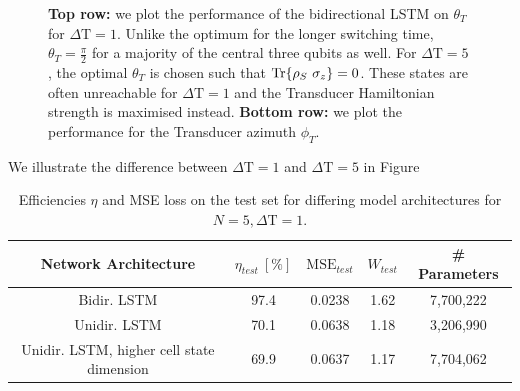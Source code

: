 \begin{figure}
\begin{subfigure}{0.32\textwidth}
	\end{subfigure}
	\caption{\textbf{Top row:} we plot the performance of the bidirectional LSTM on $\theta_T$ for $\Delta \mathrm{T} = 1$. Unlike the optimum for the longer switching time, $\theta_T = \frac{\pi}{2}$ for a majority of the central three qubits as well. For $\Delta \mathrm{T} = 5$, the optimal $\theta_T$ is chosen such that $\Tr{\rho_S \ \sigma_z} = 0$. These states are often unreachable for $\Delta \mathrm{T} = 1$ and the Transducer Hamiltonian strength is maximised instead.  \textbf{Bottom row:} we plot the performance for the Transducer azimuth $\phi_T$.}
	\label{dt1box}
\end{figure}

We illustrate the difference between $\Delta \mathrm{T} = 1$ and $\Delta \mathrm{T} = 5$ in Figure

\begin{table}[h]
	\centering
	\begin{tabular}{ c | c | c | c | c }
		Network Architecture & $\eta_{test} \ [\%]$ & $\mathrm{MSE}_{test}$  & $W_{test}$ & \# Parameters \\
		\hline
		Bidir. LSTM & 97.4 & 0.0238& 1.62   & 7,700,222 \\
		Unidir. LSTM & 70.1 & 0.0638 & 1.18 & 3,206,990 \\
		Unidir. LSTM, higher cell state dimension & 69.9 & 0.0637 & 1.17 & 7,704,062 \\
	\end{tabular}
	\caption{Efficiencies $\eta$ and MSE loss on the test set for differing model architectures for $N=5, \Delta \mathrm{T} = 1$.}
	\label{effdt1}
\end{table}


